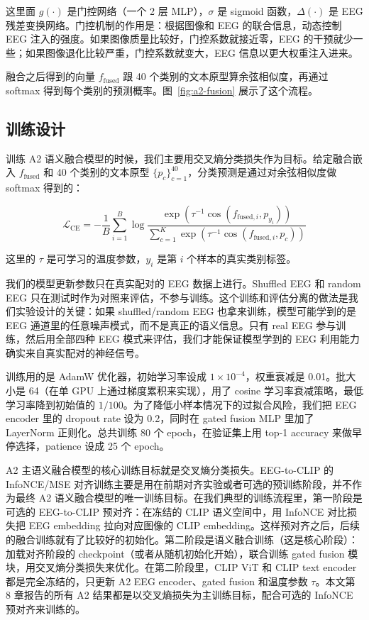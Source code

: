 这里面 $g(\cdot)$ 是门控网络（一个 2 层 MLP），$\sigma$ 是 sigmoid 函数，$\Delta(\cdot)$ 是 EEG 残差变换网络。门控机制的作用是：根据图像和 EEG 的联合信息，动态控制 EEG 注入的强度。如果图像质量比较好，门控系数就接近零，EEG 的干预就少一些；如果图像退化比较严重，门控系数就变大，EEG 信息以更大权重注入进来。

融合之后得到的向量 $f_{\mathrm{fused}}$ 跟 40 个类别的文本原型算余弦相似度，再通过 softmax 得到每个类别的预测概率。图~\ref{fig:a2-fusion} 展示了这个流程。


\subsection{训练设计}

训练 A2 语义融合模型的时候，我们主要用交叉熵分类损失作为目标。给定融合嵌入 $f_{\mathrm{fused}}$ 和 40 个类别的文本原型 $\{p_c\}_{c=1}^{40}$，分类预测是通过对余弦相似度做 softmax 得到的：

\begin{equation}
  \mathcal{L}_{\mathrm{CE}} = -\frac{1}{B} \sum_{i=1}^{B} \log \frac{\exp(\tau^{-1} \cos(f_{\mathrm{fused},i}, p_{y_i}))}{\sum_{c=1}^{K} \exp(\tau^{-1} \cos(f_{\mathrm{fused},i}, p_c))}
\end{equation}

这里的 $\tau$ 是可学习的温度参数，$y_i$ 是第 $i$ 个样本的真实类别标签。

我们的模型更新参数只在真实配对的 EEG 数据上进行。Shuffled EEG 和 random EEG 只在测试时作为对照来评估，不参与训练。这个训练和评估分离的做法是我们实验设计的关键：如果 shuffled/random EEG 也拿来训练，模型可能学到的是 EEG 通道里的任意噪声模式，而不是真正的语义信息。只有 real EEG 参与训练，然后用全部四种 EEG 模式来评估，我们才能保证模型学到的 EEG 利用能力确实来自真实配对的神经信号。

训练用的是 AdamW 优化器，初始学习率设成 $1\times10^{-4}$，权重衰减是 0.01。批大小是 64（在单 GPU 上通过梯度累积来实现），用了 cosine 学习率衰减策略，最低学习率降到初始值的 $1/100$。为了降低小样本情况下的过拟合风险，我们把 EEG encoder 里的 dropout rate 设为 0.2，同时在 gated fusion MLP 里加了 LayerNorm 正则化。总共训练 80 个 epoch，在验证集上用 top-1 accuracy 来做早停选择，patience 设成 25 个 epoch。

A2 主语义融合模型的核心训练目标就是交叉熵分类损失。EEG-to-CLIP 的 InfoNCE/MSE 对齐训练主要是用在前期对齐实验或者可选的预训练阶段，并不作为最终 A2 语义融合模型的唯一训练目标。在我们典型的训练流程里，第一阶段是可选的 EEG-to-CLIP 预对齐：在冻结的 CLIP 语义空间中，用 InfoNCE 对比损失把 EEG embedding 拉向对应图像的 CLIP embedding。这样预对齐之后，后续的融合训练就有了比较好的初始化。第二阶段是语义融合训练（这是核心阶段）：加载对齐阶段的 checkpoint（或者从随机初始化开始），联合训练 gated fusion 模块，用交叉熵分类损失来优化。在第二阶段里，CLIP ViT 和 CLIP text encoder 都是完全冻结的，只更新 A2 EEG encoder、gated fusion 和温度参数 $\tau$。本文第 8 章报告的所有 A2 结果都是以交叉熵损失为主训练目标，配合可选的 InfoNCE 预对齐来训练的。

